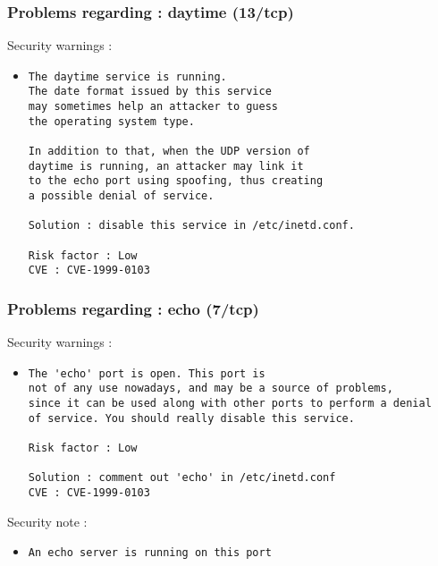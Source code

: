 \documentclass{article}
\begin{document}
\subsubsection{Problems regarding : daytime (13/tcp)}
Security warnings :\\
\begin{itemize}
\item \begin{verbatim}
The daytime service is running.
The date format issued by this service
may sometimes help an attacker to guess
the operating system type. 

In addition to that, when the UDP version of
daytime is running, an attacker may link it 
to the echo port using spoofing, thus creating
a possible denial of service.

Solution : disable this service in /etc/inetd.conf.

Risk factor : Low
CVE : CVE-1999-0103
\end{verbatim}\end{itemize}
\subsubsection{Problems regarding : echo (7/tcp)}
Security warnings :\\
\begin{itemize}
\item \begin{verbatim}
The 'echo' port is open. This port is
not of any use nowadays, and may be a source of problems, 
since it can be used along with other ports to perform a denial
of service. You should really disable this service.

Risk factor : Low

Solution : comment out 'echo' in /etc/inetd.conf
CVE : CVE-1999-0103
\end{verbatim}\end{itemize}
Security note :\\
\begin{itemize}
\item \begin{verbatim}
An echo server is running on this port
\end{verbatim}\end{itemize}
\end{document}
